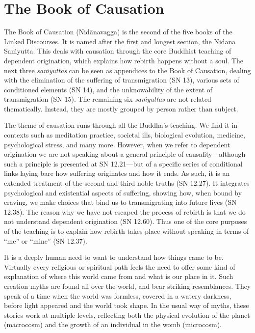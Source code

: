 \documentclass[12pt,openany]{book}%
\begin{document}
\section*{The Book of Causation}

The Book of Causation (\textsanskrit{Nidānavagga}) is the second of the five books of the Linked Discourses. It is named after the first and longest section, the \textsanskrit{Nidāna} \textsanskrit{Saṁyutta}. This deals with causation through the core Buddhist teaching of dependent origination, which explains how rebirth happens without a soul. The next three \textit{\textsanskrit{saṁyuttas}} can be seen as appendices to the Book of Causation, dealing with the elimination of the suffering of transmigration (SN 13), various sets of conditioned elements (SN 14), and the unknowability of the extent of transmigration (SN 15). The remaining six \textit{\textsanskrit{saṁyuttas}} are not related thematically. Instead, they are mostly grouped by person rather than subject.

The theme of causation runs through all the Buddha’s teaching. We find it in contexts such as meditation practice, societal ills, biological evolution, medicine, psychological stress, and many more. However, when we refer to dependent origination we are not speaking about a general principle of causality—although such a principle is presented at SN 12.21—but of a specific series of conditional links laying bare how suffering originates and how it ends. As such, it is an extended treatment of the second and third noble truths (SN 12.27). It integrates psychological and existential aspects of suffering, showing how, when bound by craving, we make choices that bind us to transmigrating into future lives (SN 12.38). The reason why we have not escaped the process of rebirth is that we do not understand dependent origination (SN 12.60). Thus one of the core purposes of the teaching is to explain how rebirth takes place without speaking in terms of “me” or “mine” (SN 12.37).

It is a deeply human need to want to understand how things came to be. Virtually every religious or spiritual path feels the need to offer some kind of explanation of where this world came from and what is our place in it. Such creation myths are found all over the world, and bear striking resemblances. They speak of a time when the world was formless, covered in a watery darkness, before light appeared and the world took shape. In the usual way of myths, these stories work at multiple levels, reflecting both the physical evolution of the planet (macrocosm) and the growth of an individual in the womb (microcosm).
\end{document}
